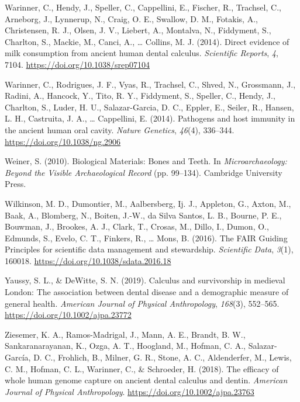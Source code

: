 \documentclass[
  b5paper,
]{book}
\newlength{\cslhangindent}
\newlength{\cslentryspacingunit} %
\newenvironment{CSLReferences}[2] %
 {%
  \setlength{\parindent}{0pt}
  \ifodd #1
  \let\oldpar\par
  \def\par{\hangindent=\cslhangindent\oldpar}
  \fi
  \setlength{\parskip}{#2\cslentryspacingunit}
 }%
 {}
\begin{document}
\begin{CSLReferences}{1}{0}
\leavevmode{}%
Warinner, C., Hendy, J., Speller, C., Cappellini, E., Fischer, R.,
Trachsel, C., Arneborg, J., Lynnerup, N., Craig, O. E., Swallow, D. M.,
Fotakis, A., Christensen, R. J., Olsen, J. V., Liebert, A., Montalva,
N., Fiddyment, S., Charlton, S., Mackie, M., Canci, A., \ldots{}
Collins, M. J. (2014). Direct evidence of milk consumption from ancient
human dental calculus. \emph{Scientific Reports}, \emph{4}, 7104.
\url{https://doi.org/10.1038/srep07104}

\leavevmode{}%
Warinner, C., Rodrigues, J. F., Vyas, R., Trachsel, C., Shved, N.,
Grossmann, J., Radini, A., Hancock, Y., Tito, R. Y., Fiddyment, S.,
Speller, C., Hendy, J., Charlton, S., Luder, H. U., Salazar-Garcia, D.
C., Eppler, E., Seiler, R., Hansen, L. H., Castruita, J. A., \ldots{}
Cappellini, E. (2014). Pathogens and host immunity in the ancient human
oral cavity. \emph{Nature Genetics}, \emph{46}(4), 336--344.
\url{https://doi.org/10.1038/ng.2906}

\leavevmode{}%
Weiner, S. (2010). Biological {Materials}: {Bones} and {Teeth}. In
\emph{Microarchaeology: {Beyond} the {Visible Archaeological Record}}
(pp. 99--134). {Cambridge University Press}.

\leavevmode{}%
Wilkinson, M. D., Dumontier, M., Aalbersberg, Ij. J., Appleton, G.,
Axton, M., Baak, A., Blomberg, N., Boiten, J.-W., da Silva Santos, L.
B., Bourne, P. E., Bouwman, J., Brookes, A. J., Clark, T., Crosas, M.,
Dillo, I., Dumon, O., Edmunds, S., Evelo, C. T., Finkers, R., \ldots{}
Mons, B. (2016). The {FAIR Guiding Principles} for scientific data
management and stewardship. \emph{Scientific Data}, \emph{3}(1), 160018.
\url{https://doi.org/10.1038/sdata.2016.18}

\leavevmode{}%
Yaussy, S. L., \& DeWitte, S. N. (2019). Calculus and survivorship in
medieval {London}: {The} association between dental disease and a
demographic measure of general health. \emph{American Journal of
Physical Anthropology}, \emph{168}(3), 552--565.
\url{https://doi.org/10.1002/ajpa.23772}

\leavevmode{}%
Ziesemer, K. A., Ramos-Madrigal, J., Mann, A. E., Brandt, B. W.,
Sankaranarayanan, K., Ozga, A. T., Hoogland, M., Hofman, C. A.,
Salazar-García, D. C., Frohlich, B., Milner, G. R., Stone, A. C.,
Aldenderfer, M., Lewis, C. M., Hofman, C. L., Warinner, C., \&
Schroeder, H. (2018). The efficacy of whole human genome capture on
ancient dental calculus and dentin. \emph{American Journal of Physical
Anthropology}. \url{https://doi.org/10.1002/ajpa.23763}


\end{CSLReferences}
\end{document}
